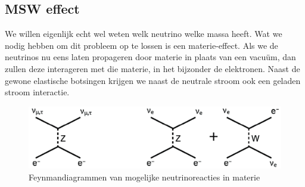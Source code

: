 \documentclass[../main.tex]{subfiles}
\begin{document}
\subsection{MSW effect}%
\label{sub:msw_effect}

We willen eigenlijk echt wel weten welk neutrino welke massa heeft. Wat we nodig hebben om dit probleem op te lossen is een materie-effect. Als we de neutrinos nu eens laten propageren door materie in plaats van een vacuüm, dan zullen deze interageren met die materie, in het bijzonder de elektronen. Naast de gewone elastische botsingen krijgen we naast de neutrale stroom ook een geladen stroom interactie.

\begin{figure}[h]
    \centering
    \includegraphics[width=0.7\linewidth]{neutrinos/msw_effect_diagrammen.png}
    \caption{Feynmandiagrammen van mogelijke neutrinoreacties in materie}%
    \label{fig:neutrinos/msw_effect_diagrammen}
\end{figure}
\end{document}
